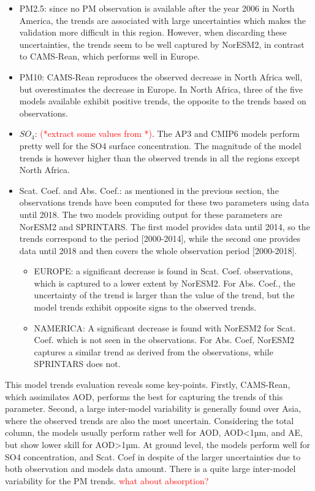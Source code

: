 \documentclass[journal abbreviation, manuscript]{copernicus}
\begin{document}
\begin{itemize}
 \item PM2.5: since no PM observation is available after the year 2006 in North America, the trends are associated with large uncertainties which makes the validation more difficult in this region. However, when discarding these uncertainties, the trends seem to be well captured by NorESM2, in contrast to CAMS-Rean, which performs well in Europe.
 \item PM10: CAMS-Rean reproduces the observed decrease in North Africa well, but overestimates the decrease in Europe. In North Africa, three of the five models available exhibit positive trends, the opposite to the trends based on observations.
 \item $SO_{4}$: \textcolor{red}{(*extract some values from \cite{aas2019global}*)}. The AP3 and CMIP6 models perform pretty well for the SO4 surface concentration. The magnitude of the model trends is however higher than the observed trends in all the regions except North Africa.
 \item Scat. Coef. and Abs. Coef.:  as mentioned in the previous section, the observations trends have been computed for these two parameters using data until 2018. The two models providing output for these parameters are NorESM2 and SPRINTARS. The first model provides data until 2014, so the trends correspond to the period [2000-2014], while the second one provides data until 2018 and then covers the whole observation period [2000-2018].
       \begin{itemize}
        \item EUROPE: a significant decrease is found in Scat. Coef. observations, which is captured to a lower extent by NorESM2. For Abs. Coef., the uncertainty of the trend is larger than the value of the trend, but the model trends exhibit opposite signs to the observed trends.
        \item NAMERICA: A significant decrease is found with NorESM2 for Scat. Coef. which is not seen in the observations. For Abs. Coef, NorESM2 captures a similar trend as derived from the observations, while SPRINTARS does not.
       \end{itemize}
\end{itemize}

This model trends evaluation reveals some key-points. Firstly, CAMS-Rean, which assimilates AOD, performs the best for capturing the trends of this parameter. Second, a large inter-model variability is generally found over Asia, where the observed trends are also the most uncertain.
Considering the total column, the models usually perform rather well for AOD, AOD<1µm, and AE, but show lower skill for AOD>1µm. At ground level, the models perform well for SO4 concentration, and Scat. Coef in despite of the larger uncertainties due to both observation and models data amount. There is a quite large inter-model variability for the PM trends. \textcolor{red}{what about absorption?}
\end{document}
